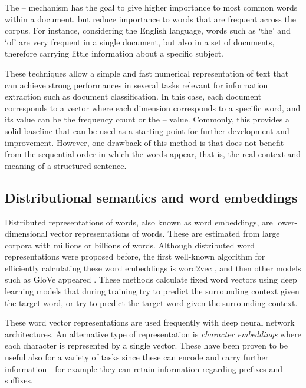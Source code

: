 The -- mechanism has the goal to give higher importance to most common words within a document, but reduce importance to words that are frequent across the corpus.
For instance, considering the English language, words such as `the' and `of' are very frequent in a single document, but also in a set of documents, therefore carrying little information about a specific subject.

These techniques allow a simple and fast numerical representation of text that can achieve strong performances in several  tasks relevant for information extraction such as document classification.
In this case, each document corresponds to a vector where each dimension corresponds to a specific word, and its value can be the frequency count or the -- value.
Commonly, this provides a solid baseline that can be used as a starting point for further development and improvement.
However, one drawback of this method is that does not benefit from the sequential order in which the words appear, that is, the real context and meaning of a structured sentence.


\subsection{Distributional semantics and word embeddings}

Distributed representations of words, also known as word embeddings, are lower-dimensional vector representations of words.
These are estimated from large corpora with millions or billions of words.
Although distributed word representations were proposed before, the first well-known algorithm for efficiently calculating these word embeddings is word2vec \parencite{mikolov2013b,mikolov2013a}, and then other models such as GloVe appeared \parencite{pennington2014a}.
These methods calculate fixed word vectors using deep learning models that during training try to predict the surrounding context given the target word, or try to predict the target word given the surrounding context.

These word vector representations are used frequently with deep neural network architectures.
An alternative type of representation is \textit{character embeddings} where each character is represented by a single vector.
These have been proven to be useful also for a variety of  tasks since these can encode and carry further information---for example they can retain information regarding prefixes and suffixes.


